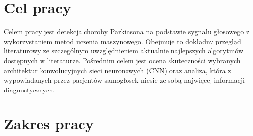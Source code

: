 
\section{Cel pracy}
\label{sec:celPracy}

Celem pracy jest detekcja choroby Parkinsona na podstawie sygnału głosowego z wykorzystaniem metod uczenia maszynowego.
Obejmuje to dokładny przegląd literaturowy ze szczególnym uwzględnieniem aktualnie najlepszych algorytmów
dostępnych w literaturze.
Pośrednim celem jest ocena skuteczności wybranych architektur konwolucyjnych sieci neuronowych (CNN) oraz analiza, która z wypowiadanych przez
pacjentów samogłosek niesie ze sobą najwięcej informacji diagnostycznych.


\section{Zakres pracy}
\label{sec:zakresPracy}
